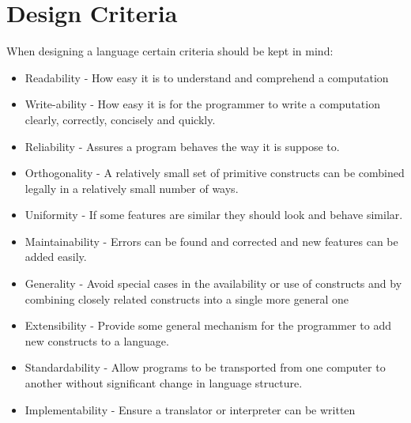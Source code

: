 \section{Design Criteria}
When designing a language certain criteria should be kept in mind:
\begin{itemize}
\item Readability
- How easy it is to understand and comprehend a computation
\item Write-ability
- How easy it is for the programmer to write a computation clearly, correctly, concisely and quickly. 
\item Reliability
- Assures a program behaves the way it is suppose to.
\item Orthogonality
- A relatively small set of primitive constructs can be combined legally in a relatively small number of ways.
\item Uniformity
- If some features are similar they should look and behave similar.
\item Maintainability
- Errors can be found and corrected and new features can be added easily.
\item Generality
- Avoid special cases in the availability or use of constructs and by combining closely related constructs into a single more general one	
\item Extensibility
- Provide some general mechanism for the programmer to add new constructs to a language.
\item Standardability
- Allow programs to be transported from one computer to another without significant change in language structure.
\item Implementability
- Ensure a translator or interpreter can be written
\end{itemize}
